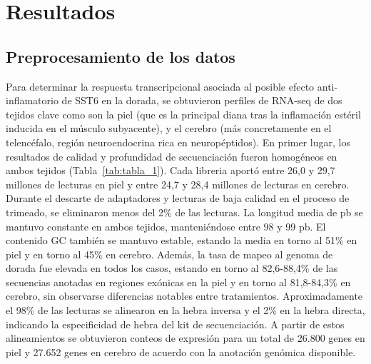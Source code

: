 \documentclass[10pt,a4paper]{article}
\begin{document}
\section{Resultados}
\subsection{Preprocesamiento de los datos}
Para determinar la respuesta transcripcional asociada al posible efecto anti-inflamatorio de SST6 en la dorada, se obtuvieron perfiles de RNA-seq de dos tejidos clave como son la piel (que es la principal diana tras la inflamación estéril inducida en el músculo subyacente), y el cerebro (más concretamente en el telencéfalo, región neuroendocrina rica en neuropéptidos). En primer lugar, los resultados de calidad y profundidad de secuenciación fueron homogéneos en ambos tejidos (Tabla~\ref{tab:tabla_1}). Cada libreria aportó entre 26,0 y 29,7 millones de lecturas en piel y entre 24,7 y 28,4 millones de lecturas en cerebro. Durante el descarte de adaptadores y lecturas de baja calidad en el proceso de trimeado, se eliminaron menos del 2\% de las lecturas. La longitud media de pb se mantuvo constante en ambos tejidos, manteniéndose entre 98 y 99 pb. El contenido GC también se mantuvo estable, estando la media en torno al 51\% en piel y en torno al 45\% en cerebro. Además, la tasa de mapeo al genoma de dorada fue elevada en todos los casos, estando en torno al 82,6-88,4\% de las secuencias anotadas en regiones exónicas en la piel y en torno al 81,8-84,3\% en cerebro, sin observarse diferencias notables entre tratamientos. Aproximadamente el 98\% de las lecturas se alinearon en la hebra inversa y el 2\% en la hebra directa, indicando la especificidad de hebra del kit de secuenciación. A partir de estos alineamientos se obtuvieron conteos de expresión para un total de 26.800 genes en piel y 27.652 genes en cerebro de acuerdo con la anotación genómica disponible.
\end{document}
